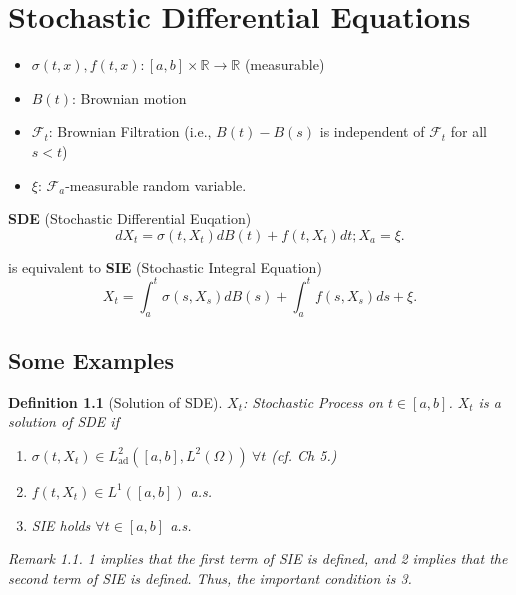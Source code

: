 \documentclass[12pt]{report}
\newcommand{\R}{\mathbb{R}}
\newcommand{\F}{\mathcal{F}}
\renewcommand{\1}{\mathbb{1}}
\renewcommand{\O}{\Omega}
\theoremstyle{break}
\theoremstyle{newdef}
\newtheorem{defn}[thm]{Definition} %
\theoremstyle{remark}
\newtheorem*{rem}{Remark} %
\begin{document}
\setcounter{chapter}{9}
\chapter{Stochastic Differential Equations}

\begin{itemize}
\item
$\sigma(t,x), f(t,x): [a,b]\times\R \rightarrow \R$ (measurable)

\item
$B(t)$: Brownian motion

\item
$\F_t$: Brownian Filtration (i.e., $B(t) - B(s)$ is independent of $\F_t$ for all $s < t$)

\item
$\xi$: $\F_a$-measurable random variable.
\end{itemize}


\vspace{5mm}

\textbf{SDE} (Stochastic Differential Euqation)
$$
dX_t = \sigma(t,X_t) dB(t) + f(t,X_t)dt; X_a = \xi.
$$

is equivalent to \textbf{SIE} (Stochastic Integral Equation)
$$
X_t = \int_a^t \sigma(s, X_s) dB(s) + \int_a^t f(s,X_s)ds + \xi.
$$

\section{Some Examples}


\begin{defn}[Solution of SDE]
$X_t$: Stochastic Process on $t \in [a,b]$.
$X_t$ is a solution of SDE if
\begin{enumerate}
\item
$\sigma(t,X_t) \in L^2_{\text{ad}}([a,b], L^2(\O)) \ \forall t$ (\textit{cf.} Ch 5.)

\item
$f(t,X_t) \in L^1([a,b])$ a.s.

\item
SIE holds $\forall t \in [a,b]$ a.s.
\end{enumerate}

\begin{rem}
1 implies that the first term of SIE is defined, and 2 implies that the second term of SIE is defined.
Thus, the important condition is 3.
\end{rem}
\end{defn}
\end{document}
